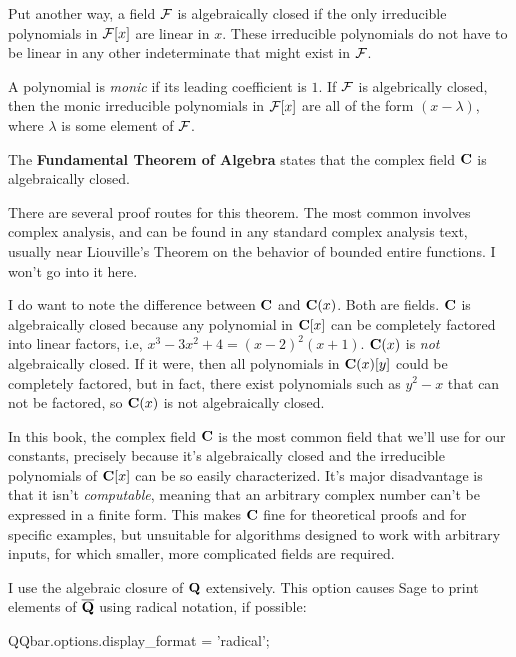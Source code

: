 Put another way, a field ${\cal F}$ is algebraically closed if the
only irreducible polynomials in ${\cal F}[x]$ are linear in $x$.
These irreducible polynomials do not have to be linear in any other
indeterminate that might exist in ${\cal F}$.

A polynomial is {\it monic} if its leading coefficient is $1$.  If
${\cal F}$ is algebrically closed, then the monic irreducible
polynomials in ${\cal F}[x]$ are all of the form $(x-\lambda)$, where
$\lambda$ is some element of ${\cal F}$.

\begin{key point}
The {\bf Fundamental Theorem of
Algebra} states that the complex field ${\bf C}$ is algebraically
closed.
\end{key point}

There are several proof routes for this theorem.  The most
common involves complex analysis, and can be found in any standard
complex analysis text, usually near Liouville's Theorem on the
behavior of bounded entire functions.  I won't go into it here.

I do want to note the difference between ${\bf C}$ and ${\bf C}(x)$.
Both are fields.  ${\bf C}$ is algebraically closed because any
polynomial in ${\bf C}[x]$ can be completely factored into linear
factors, i.e, $x^3-3x^2+4=(x-2)^2(x+1)$.  ${\bf C}(x)$ is {\it not} algebraically closed.
If it were, then all polynomials in ${\bf C}(x)[y]$ could
be completely factored, but in fact, there exist polynomials
such as $y^2-x$ that can not be factored, so ${\bf C}(x)$
is not algebraically closed.

In this book, the complex field ${\bf C}$ is the most common field
that we'll use for our constants, precisely because it's algebraically
closed and the irreducible polynomials of ${\bf C}[x]$ can be so
easily characterized.  It's major disadvantage is that it isn't {\it
computable}, meaning that an arbitrary complex number can't be
expressed in a finite form.  This makes ${\bf C}$ fine for theoretical
proofs and for specific examples, but unsuitable for algorithms
designed to work with arbitrary inputs, for which smaller,
more complicated fields are required.

I use the algebraic closure of ${\bf Q}$ extensively.  This
option causes Sage to print elements of $\overline{\bf Q}$
using radical notation, if possible:

\begin{sageblock}
QQbar.options.display_format = 'radical';
\end{sageblock}

